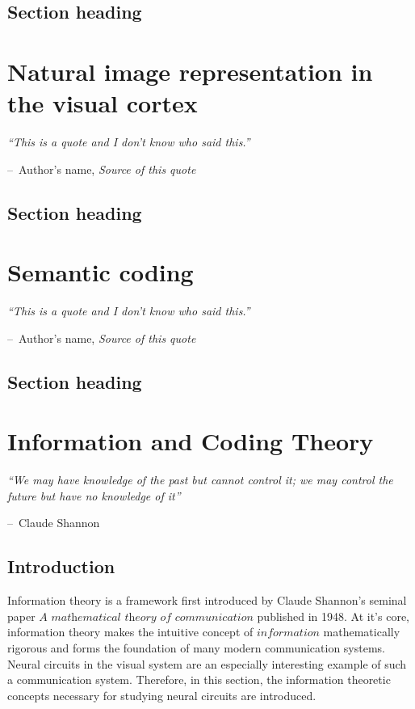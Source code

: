 \documentclass[a4paper,11pt]{book}
\makeatletter
\newenvironment{chapquote}[2][2em]
  {\setlength{\@tempdima}{#1}%
   \def\chapquote@author{#2}%
   \parshape 1 \@tempdima \dimexpr\textwidth-2\@tempdima\relax%
   \itshape}
  {\par\normalfont\hfill--\ \chapquote@author\hspace*{\@tempdima}\par\bigskip}
\makeatother
\begin{document}
\section{Section heading}

\chapter{Natural image representation in the visual cortex}

\begin{chapquote}{Author's name, \textit{Source of this quote}}
``This is a quote and I don't know who said this.''
\end{chapquote}

\section{Section heading}

\chapter{Semantic coding}

\begin{chapquote}{Author's name, \textit{Source of this quote}}
``This is a quote and I don't know who said this.''
\end{chapquote}

\section{Section heading}

\chapter{Information and Coding Theory}

\begin{chapquote}{Claude Shannon}
``We may have knowledge of the past but cannot control it; we may control the future but have no knowledge of it''
\end{chapquote}

\section{Introduction}

Information theory is a framework first introduced by Claude Shannon's seminal paper $\textit{A mathematical theory of communication}$  published in 1948. At it's core, information theory makes the intuitive concept of $\textit{information}$ mathematically rigorous and forms the foundation of many modern communication systems. Neural circuits in the visual system are an especially interesting example of such a communication system. Therefore, in this section, the information theoretic concepts necessary for studying neural circuits are introduced. 
\end{document}
